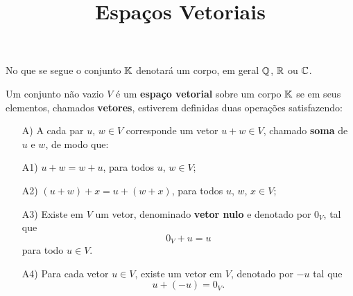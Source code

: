 \documentclass{beamer}
\title{Espaços Vetoriais}
\author[\autor]{\autor}
\institute[\instituto]{\instituto}
\date{}
\begin{document}
    \begin{frame}
        \maketitle
    \end{frame}


    \begin{frame}
        No que se segue o conjunto $\mathbb{K}$ denotar\'a um corpo, em geral $\mathbb{Q}$, $\mathbb{R}$ ou $\mathbb{C}$.

        \vspace{.3cm}

        \begin{definicao}
    	    Um conjunto	n\~ao vazio $V$ \'e um \textbf{espa\c{c}o vetorial} sobre um corpo $\mathbb{K}$ se em seus elementos, chamados \textbf{vetores}, estiverem definidas duas opera\c{c}\~oes satisfazendo:
    	    \begin{itemize}
        		\item[A)] A cada par $u$, $w \in V$ corresponde um vetor $u + w \in V$, chamado \textbf{soma} de $u$ e $w$, de modo que:

                \vspace{.3cm}

		        \item[A1)] $u + w = w + u$, para todos $u$, $w \in V$;
	
                \vspace{.3cm}

        	    \item[A2)] $(u + w) + x = u + (w + x)$, para todos $u$, $w$, $x \in V$;
	    	\end{itemize}
	    \end{definicao}
	\end{frame}

	\begin{frame}
	    \begin{definicao}
	        \begin{itemize}
        		\item[A3)] Existe em $V$ um vetor, denominado \textbf{vetor nulo} e denotado por $0_V$, tal que
	    	    \[
	        		0_V + u = u
    		    \]
    		    para todo $u \in V$.
	
                \vspace{.3cm}

             	\item[A4)] Para cada vetor $u \in V$, existe um vetor em $V$, denotado por $-u$ tal que
    	    	\[
		        	u + (-u) = 0_V.
    	    	\]
	    	\end{itemize}
	    \end{definicao}
	\end{frame}
\end{document}
